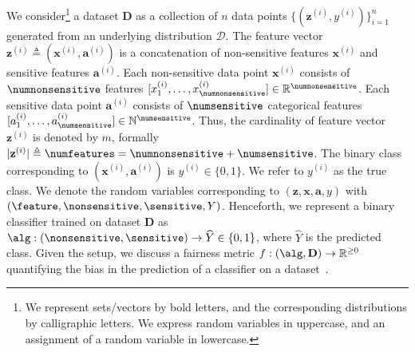 
We consider\footnote{{We represent sets/vectors by bold letters, and the corresponding distributions by calligraphic letters. We express random variables in uppercase, and an assignment of a random variable in lowercase.}} a dataset $ \mathbf{D} $ as a collection of $n$ data points  $\{(\mathbf{z}^{(i)}, y^{(i)})\}_{i=1}^n$  generated from an underlying distribution $\mathcal{D}$. The feature vector $\mathbf{z}^{(i)} \triangleq (\mathbf{x}^{(i)}, \mathbf{a}^{(i)}) $ is a concatenation of non-sensitive features $ \mathbf{x}^{(i)} $ and sensitive features $ \mathbf{a}^{(i)} $. Each non-sensitive data point $\mathbf{x}^{(i)}$ consists of $\numnonsensitive$ features $[x^{(i)}_1, \dots, x^{(i)}_{\numnonsensitive}] \in \mathbb{R}^{\numnonsensitive} $. Each sensitive data point $\mathbf{a}^{(i)}$ consists of $\numsensitive$ categorical features $[a^{(i)}_1, \dots, a^{(i)}_{\numsensitive}] \in \mathbb{N}^{\numsensitive} $. Thus, the cardinality of feature vector $ \mathbf{z}^{(i)} $ is denoted by $ m $, formally $ |\mathbf{z}^{(i)}| \triangleq \numfeatures = \numnonsensitive + \numsensitive $. The binary class corresponding to $(\mathbf{x}^{(i)}, \mathbf{a}^{(i)})$ is $y^{(i)} \in \{0,1\}$. We refer to $y^{(i)}$ as the true class. We denote the random variables corresponding to $ (\mathbf{z}, \mathbf{x}, \mathbf{a},  y) $ with $ (\feature, \nonsensitive, \sensitive, Y) $.  Henceforth, we represent a binary classifier trained on dataset $\mathbf{D}$ as $\alg: (\nonsensitive, \sensitive) \rightarrow \widehat{Y} \in \{0,1\} $, where $\widehat{Y} $ is the predicted class. Given the setup, we discuss a fairness metric $ f: (\alg, \mathbf{D}) \rightarrow \mathbb{R}^{\ge 0} $ quantifying the bias in the prediction of a classifier on a dataset~\cite{feldman2015certifying,hardt2016equality,verma2018fairness}.



